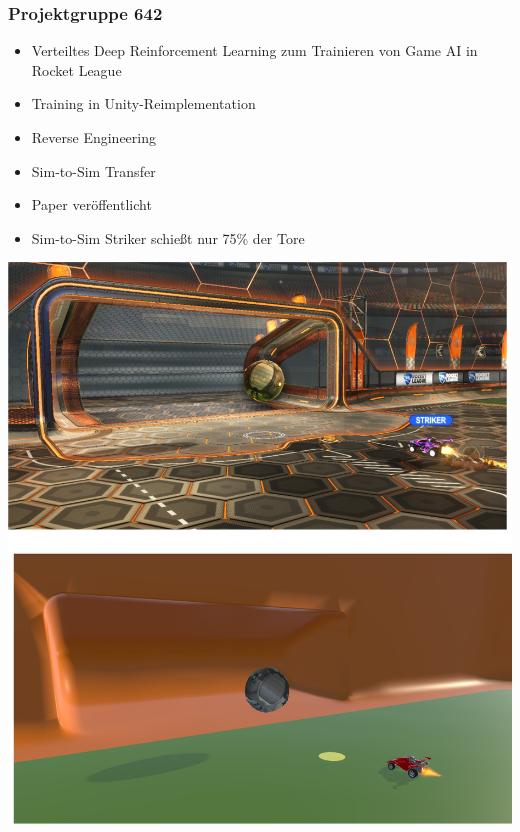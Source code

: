 \documentclass{beamer}
\begin{document}
 \begin{frame}
 \frametitle{Projektgruppe 642}
 \begin{minipage}[c]{0.5\textwidth}
  \begin{itemize}
   \item Verteiltes Deep Reinforcement Learning zum Trainieren von Game AI in Rocket League
   \item Training in Unity-Reimplementation
   \item Reverse Engineering
   \item Sim-to-Sim Transfer
   \item Paper veröffentlicht
   \item Sim-to-Sim Striker schießt nur 75\% der Tore
  \end{itemize}
  \end{minipage}
\begin{minipage}[c]{0.48\textwidth}
 \includegraphics[width=\textwidth]{robo_vergleich.png}
\end{minipage}
 \end{frame}
\end{document}
